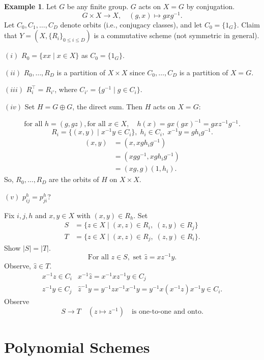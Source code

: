 \documentclass[
]{book}
\theoremstyle{definition}
\theoremstyle{definition}
\newtheorem{example}{Example}[chapter]
\theoremstyle{definition}
\theoremstyle{definition}
\theoremstyle{remark}
\begin{document}
\begin{example}
\protect\hypertarget{exm:centralizer-alg}{}\label{exm:centralizer-alg}Let \(G\) be any finite group. \(G\) acts on \(X = G\) by conjugation.
\[G\times X \to X, \quad (g,x)\mapsto gxg^{-1}.\]
Let \(C_0, C_1, \ldots, C_D\) denote orbits (i.e., conjugacy classes), and let \(C_0 = \{1_G\}\).
Claim that \(Y = (X, \{R_i\}_{0\leq i\leq D})\) is a commutative scheme (not symmetric in general).

\((i)\) \(R_0 = \{xx\mid x\in X\}\) as \(C_0 = \{1_G\}\).

\((ii)\) \(R_0, \ldots, R_D\) is a partition of \(X\times X\) since \(C_0, \ldots, C_D\) is a partition of \(X = G\).

\((iii)\) \(R_i^\top = R_{i'}\), where \(C_{i'} = \{g^{-1}\mid g\in C_i\}\).

\((iv)\) Set \(H = G\oplus G\), the direct sum. Then \(H\) acts on \(X = G\):

\[\text{for all }h = (g,gz), \text{for all }x\in X, \quad h(x) = gx(gx)^{-1} = gxz^{-1}g^{-1}.\]
\[R_i = \{(x,y)\mid x^{-1}y\in C_i\}, \; h_i\in C_i, \; x^{-1}y = gh_ig^{-1}.\]
\begin{align}
(x,y) & = (x, xgh_ig^{-1})\\
& = (xgg^{-1}, xgh_ig^{-1})\\
& = (xg, g)(1,h_i).
\end{align}
So, \(R_0, \ldots, R_D\) are the orbits of \(H\) on \(X\times X\).

\((v)\) \(p^h_{ij} = p^h_{ji}\)?

Fix \(i,j, h\) and \(x, y\in X\) with \((x,y)\in R_h\). Set
\begin{align}
S & = \{z\in X\mid (x,z)\in R_i, \; (z,y)\in R_j\}\\
T & = \{z\in X\mid (x,z)\in R_j, \; (z,y)\in R_i\}.
\end{align}
Show \(|S| = |T|\).
\[\text{For all }z\in S, \text{ set } \hat{z} = xz^{-1}y.\]
Observe, \(\hat{z}\in T\).
\begin{align}
x^{-1}z\in C_i & x^{-1}\hat{z} = x^{-1}xz^{-1}y\in C_j\\
z^{-1}y\in C_j & \hat{z}^{-1}y = y^{-1}zx^{-1}x^{-1}y = y^{-1}x(x^{-1}z)x^{-1}y \in C_i.
\end{align}
Observe
\[S\to T \quad (z\mapsto z^{-1}) \quad \text{is one-to-one and onto.}\]
\end{example}

\hypertarget{lec18}{%
\chapter{Polynomial Schemes}\label{lec18}}
\end{document}
